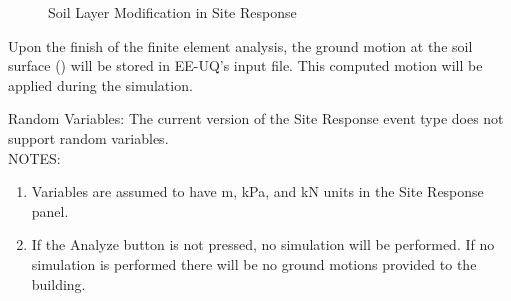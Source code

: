 \begin{figure}[!htbp]
  \caption{Soil Layer Modification in Site Response }
  \label{fig:s3hark3}
\end{figure}

Upon the finish of the finite element analysis, the ground motion at the soil surface () will be stored in EE-UQ's input file.
This computed motion will be applied during the simulation.

Random Variables: The current version of the Site Response event type does not support random variables.\\

NOTES: 
\begin{enumerate}
\item Variables are assumed to have m, kPa, and kN units in the Site Response panel.
\item If the Analyze button is not pressed, no simulation will be performed. If no simulation is performed there will be no ground motions provided to the building.
\end{enumerate}
